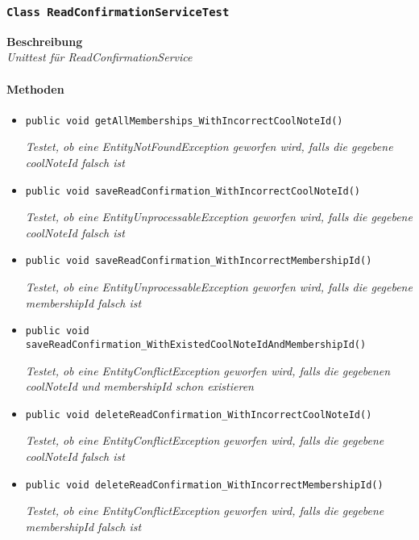  \subsubsection{\texttt{Class ReadConfirmationServiceTest}}
 \textbf{Beschreibung} \\
 \textit{Unittest für ReadConfirmationService}
 \paragraph*{Methoden}
 \begin{itemize}
    	\item{\texttt{public void getAllMemberships\_WithIncorrectCoolNoteId()}}
    	
    	\textit{Testet, ob eine EntityNotFoundException geworfen wird, falls die gegebene coolNoteId falsch ist}
    	
    	\item{\texttt{public void saveReadConfirmation\_WithIncorrectCoolNoteId()}}
    	
    	\textit{Testet, ob eine EntityUnprocessableException geworfen wird, falls die gegebene coolNoteId falsch ist}
    	
    	\item{\texttt{public void saveReadConfirmation\_WithIncorrectMembershipId()}}
    	
    	\textit{Testet, ob eine EntityUnprocessableException geworfen wird, falls die gegebene membershipId falsch ist}
    	
    	\item{\texttt{public void saveReadConfirmation\_WithExistedCoolNoteIdAndMembershipId()}}
    	
    	\textit{Testet, ob eine EntityConflictException geworfen wird, falls die gegebenen coolNoteId und membershipId schon existieren}
    	
    	\item{\texttt{public void deleteReadConfirmation\_WithIncorrectCoolNoteId()}}
    	
    	\textit{Testet, ob eine EntityConflictException geworfen wird, falls die gegebene coolNoteId falsch ist} 
    	
    	\item{\texttt{public void deleteReadConfirmation\_WithIncorrectMembershipId()}}
    	
    	\textit{Testet, ob eine EntityConflictException geworfen wird, falls die gegebene membershipId falsch ist}
 \end{itemize}

